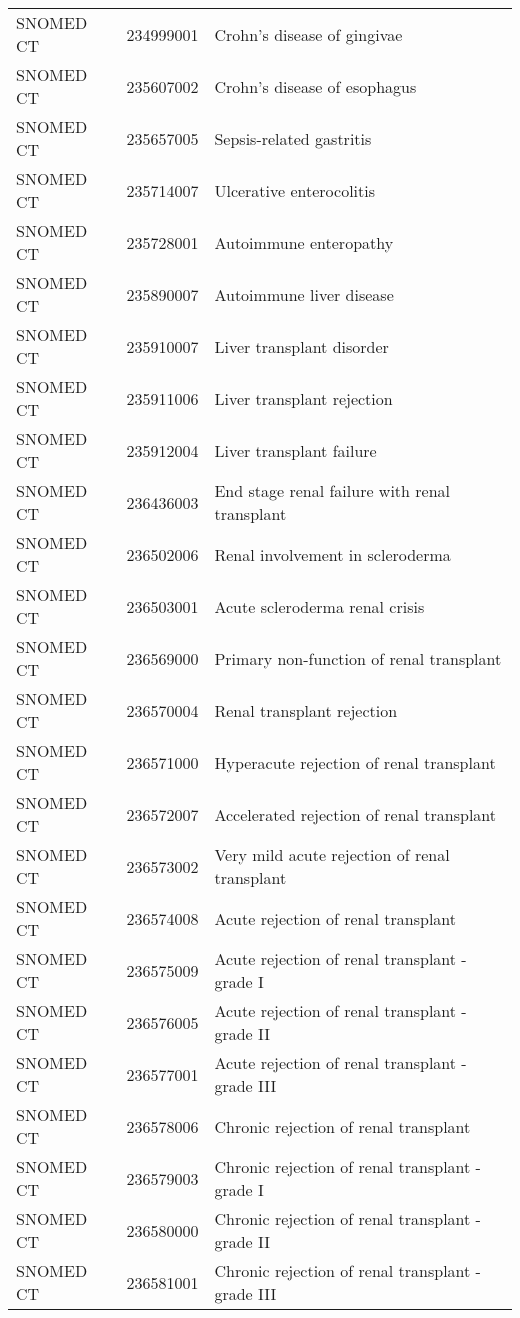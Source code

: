 \begin{longtable}{p{}p{}p{}}
  SNOMED CT & 234999001 & Crohn's disease of gingivae \\ 
  SNOMED CT & 235607002 & Crohn's disease of esophagus \\ 
  SNOMED CT & 235657005 & Sepsis-related gastritis \\ 
  SNOMED CT & 235714007 & Ulcerative enterocolitis \\ 
  SNOMED CT & 235728001 & Autoimmune enteropathy \\ 
  SNOMED CT & 235890007 & Autoimmune liver disease \\ 
  SNOMED CT & 235910007 & Liver transplant disorder \\ 
  SNOMED CT & 235911006 & Liver transplant rejection \\ 
  SNOMED CT & 235912004 & Liver transplant failure \\ 
  SNOMED CT & 236436003 & End stage renal failure with renal transplant \\ 
  SNOMED CT & 236502006 & Renal involvement in scleroderma \\ 
  SNOMED CT & 236503001 & Acute scleroderma renal crisis \\ 
  SNOMED CT & 236569000 & Primary non-function of renal transplant \\ 
  SNOMED CT & 236570004 & Renal transplant rejection \\ 
  SNOMED CT & 236571000 & Hyperacute rejection of renal transplant \\ 
  SNOMED CT & 236572007 & Accelerated rejection of renal transplant \\ 
  SNOMED CT & 236573002 & Very mild acute rejection of renal transplant \\ 
  SNOMED CT & 236574008 & Acute rejection of renal transplant \\ 
  SNOMED CT & 236575009 & Acute rejection of renal transplant - grade I \\ 
  SNOMED CT & 236576005 & Acute rejection of renal transplant - grade II \\ 
  SNOMED CT & 236577001 & Acute rejection of renal transplant - grade III \\ 
  SNOMED CT & 236578006 & Chronic rejection of renal transplant \\ 
  SNOMED CT & 236579003 & Chronic rejection of renal transplant - grade I \\ 
  SNOMED CT & 236580000 & Chronic rejection of renal transplant - grade II \\ 
  SNOMED CT & 236581001 & Chronic rejection of renal transplant - grade III \\ 

\end{longtable}
